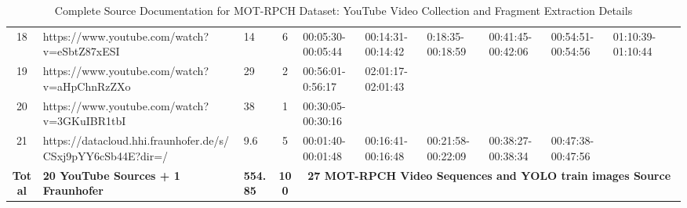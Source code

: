 \begin{landscape}
\begin{table}[!htb]
{\begin{tabular}{|c|p{10cm}|p{1.2cm}|c|p{2.8cm}|p{2.8cm}|p{2.8cm}|p{2.8cm}|p{2.8cm}|p{2.8cm}|p{2.8cm}|}
        \rowcolor{gray!10}
        18 & https://www.youtube.com/watch?v=eSbtZ87xESI & 14 & 6 & 00:05:30-00:05:44 & 00:14:31-00:14:42 & 0:18:35-00:18:59 & 00:41:45-00:42:06 & 00:54:51-00:54:56 & 01:10:39-01:10:44 &   \\ 
        19 & https://www.youtube.com/watch?v=aHpChnRzZXo & 29 & 2 & 00:56:01-0:56:17 & 02:01:17-02:01:43 & ~ & ~ & ~ & ~ &   \\ 
        \rowcolor{gray!10}
        20 & https://www.youtube.com/watch?v=3GKuIBR1tbI & 38 & 1 & 00:30:05-00:30:16 & ~ & ~ & ~ & ~ & ~ &   \\ 
        21 & https://datacloud.hhi.fraunhofer.de/s/CSxj9pYY6cSb44E?dir=/ & 9.6 & 5 & 00:01:40-00:01:48 & 00:16:41-00:16:48 & 00:21:58-00:22:09 & 00:38:27-00:38:34 & 00:47:38-00:47:56 & ~ &   \\ 
        \rowcolor{gray!20}
        \textbf{Total} & \textbf{20 YouTube Sources + 1 Fraunhofer} & \textbf{554.85} & \textbf{100} & \multicolumn{7}{c|}{\textbf{27 MOT-RPCH Video Sequences and YOLO train images Source}} \\ \hline
    \end{tabular}%
    }
    \caption{Complete Source Documentation for MOT-RPCH Dataset: YouTube Video Collection and Fragment Extraction Details}
    \label{tab:video-source-appendix}
\end{table}
\end{landscape}